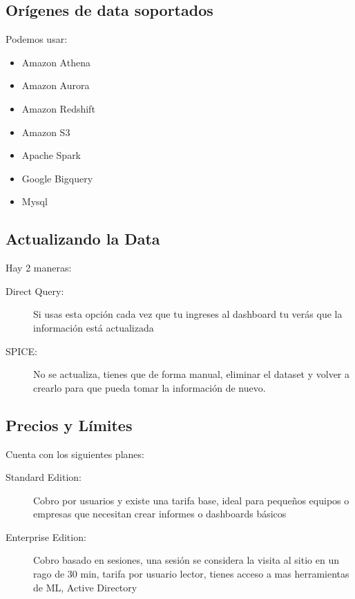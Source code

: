 \subsection{Orígenes de data soportados}
Podemos usar: \
\begin{itemize}
	\item Amazon Athena
	\item Amazon Aurora
	\item Amazon Redshift
	\item Amazon S3
	\item Apache Spark
	\item Google Bigquery
	\item Mysql
\end{itemize}

\subsection{Actualizando la Data}
Hay 2 maneras: \
\begin{description}
	\item[Direct Query:] Si usas esta opción cada vez que tu ingreses al dashboard tu verás que la información está actualizada
	\item[SPICE:] No se actualiza, tienes que de forma manual, eliminar el dataset y volver a crearlo para que pueda tomar la información de nuevo.
\end{description}

\subsection{Precios y Límites}
Cuenta con los siguientes planes: \
\begin{description}
	\item[Standard Edition:] Cobro por usuarios y existe una tarifa base, ideal para pequeños equipos o empresas que necesitan crear informes o dashboards básicos
	\item[Enterprise Edition:] Cobro basado en sesiones, una sesión se considera la visita al sitio en un rago de 30 min, tarifa por usuario lector, tienes acceso a mas herramientas de ML, Active Directory
\end{description}
